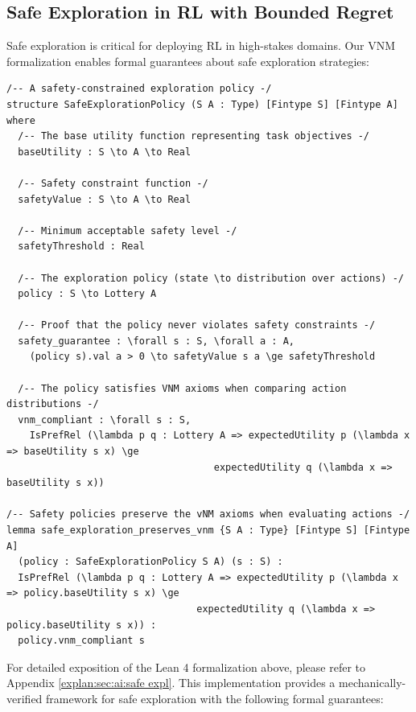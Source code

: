 \documentclass{article}
\theoremstyle{definition}
\begin{document}
\subsection{Safe Exploration in RL with Bounded Regret}\label{sec:ai:safe expl}

Safe exploration is critical for deploying RL in high-stakes domains. Our VNM formalization enables formal guarantees about safe exploration strategies:

\begin{lstlisting}[caption={Safe Exploration in RL with Bounded Regret: Lean 4 Implementation}]
/-- A safety-constrained exploration policy -/
structure SafeExplorationPolicy (S A : Type) [Fintype S] [Fintype A] where
  /-- The base utility function representing task objectives -/
  baseUtility : S \to A \to Real

  /-- Safety constraint function -/
  safetyValue : S \to A \to Real

  /-- Minimum acceptable safety level -/
  safetyThreshold : Real

  /-- The exploration policy (state \to distribution over actions) -/
  policy : S \to Lottery A

  /-- Proof that the policy never violates safety constraints -/
  safety_guarantee : \forall s : S, \forall a : A,
    (policy s).val a > 0 \to safetyValue s a \ge safetyThreshold

  /-- The policy satisfies VNM axioms when comparing action distributions -/
  vnm_compliant : \forall s : S,
    IsPrefRel (\lambda p q : Lottery A => expectedUtility p (\lambda x => baseUtility s x) \ge
                                    expectedUtility q (\lambda x => baseUtility s x))

/-- Safety policies preserve the vNM axioms when evaluating actions -/
lemma safe_exploration_preserves_vnm {S A : Type} [Fintype S] [Fintype A]
  (policy : SafeExplorationPolicy S A) (s : S) :
  IsPrefRel (\lambda p q : Lottery A => expectedUtility p (\lambda x => policy.baseUtility s x) \ge
                                 expectedUtility q (\lambda x => policy.baseUtility s x)) :
  policy.vnm_compliant s
\end{lstlisting}

For detailed exposition of the Lean 4 formalization above, please refer to Appendix \ref{explan:sec:ai:safe expl}. This implementation provides a mechanically-verified framework for safe exploration with the following formal guarantees:
\end{document}
